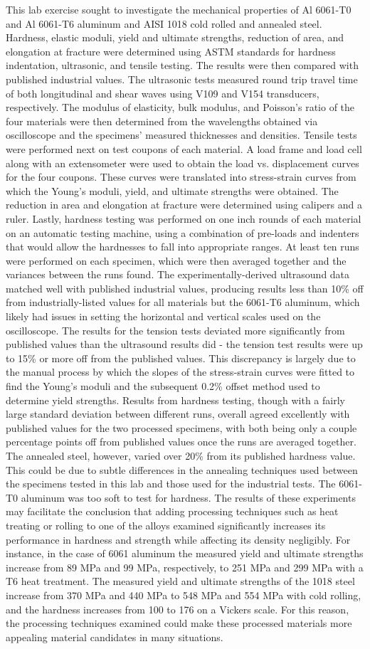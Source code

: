 \documentclass[10pt]{article}
\begin{document}
This lab exercise sought to investigate the mechanical properties of Al 6061-T0 and Al 6061-T6 aluminum and AISI 1018 cold rolled and annealed steel.  Hardness, elastic moduli, yield and ultimate strengths, reduction of area, and elongation at fracture were determined using ASTM standards for hardness indentation, ultrasonic, and tensile testing.  The results were then compared with published industrial values.  The ultrasonic tests measured round trip travel time of both longitudinal and shear waves using V109 and V154 transducers, respectively.   The modulus of elasticity, bulk modulus, and Poisson's ratio of the four materials were then determined from the wavelengths obtained via oscilloscope and the specimens' measured thicknesses and densities.    Tensile tests were performed next on test coupons of each material.  A load frame and load cell along with an extensometer were used to obtain the load vs. displacement curves for the four coupons.  These curves were translated into stress-strain curves from which the Young's moduli, yield, and ultimate strengths were obtained.  The reduction in area and elongation at fracture were determined using calipers and a ruler.  Lastly, hardness testing was performed on one inch rounds of each material on an automatic testing machine, using a combination of pre-loads and indenters that would allow the hardnesses to fall into appropriate ranges.  At least ten runs were performed on each specimen, which were then averaged together and the variances between the runs found.  The experimentally-derived ultrasound data matched well with published industrial values, producing results less than 10\% off from industrially-listed values for all materials but the 6061-T6 aluminum, which likely had issues in setting the horizontal and vertical scales used on the oscilloscope.  The results for the tension tests deviated more significantly from published values than the ultrasound results did - the tension test results were up to 15\% or more off from the published values.  This discrepancy is largely due to the manual process by which the slopes of the stress-strain curves were fitted to find the Young's moduli and the subsequent 0.2\% offset method used to determine yield strengths.  Results from hardness testing, though with a fairly large standard deviation between different runs, overall agreed excellently with published values for the two processed specimens, with both being only a couple percentage points off from published values once the runs are averaged together.  The annealed steel, however, varied over 20\% from its published hardness value.  This could be due to subtle differences in the annealing techniques used between the specimens tested in this lab and those used for the industrial tests.  The 6061-T0 aluminum was too soft to test for hardness.  The results of these experiments may facilitate the conclusion that adding processing techniques such as heat treating or rolling to one of the alloys examined significantly increases its performance in hardness and strength while affecting its density negligibly.  For instance, in the case of 6061 aluminum the measured yield and ultimate strengths increase from 89 MPa and 99 MPa, respectively, to 251 MPa and 299 MPa with a T6 heat treatment.  The measured yield and ultimate strengths of the 1018 steel increase from 370 MPa and 440 MPa to 548 MPa and 554 MPa with cold rolling, and the hardness increases from 100 to 176 on a Vickers scale.  For this reason, the processing techniques examined could make these processed materials more appealing material candidates in many situations.
\end{document}
